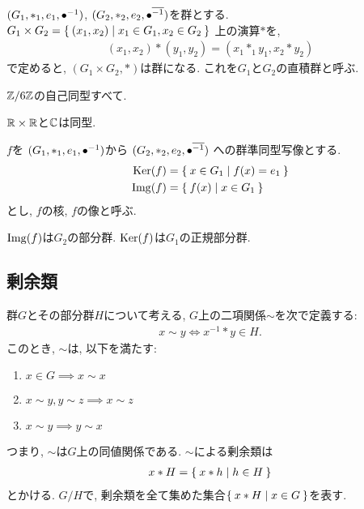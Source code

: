 \begin{prop}
  $(G_1,\ast_1,e_1,{\bullet}^{-1})$,
  $(G_2,\ast_2,e_2,{\bullet}^{\overline{-1}})$を群とする.
  $G_1\times G_2=\Set{(x_1,x_2)|x_1\in G_1,x_2\in G_2}$
  上の演算$\ast$を,
  \begin{align*}
    (x_1,x_2)\ast(y_1,y_2)=(x_1\ast_1y_1,x_2\ast y_2)
  \end{align*}
  で定めると, $(G_1\times G_2,\ast)$は群になる.
  これを$G_1$と$G_2$の直積群と呼ぶ.
\end{prop}

\begin{example}
  $\mathbb{Z}/6\mathbb{Z}$の自己同型すべて.
\end{example}
\begin{example}
$\mathbb{R}\times \mathbb{R}$と$\mathbb{C}$は同型.
\end{example}

\begin{definition}
  $f$を
  $(G_1,\ast_1,e_1,{\bullet}^{-1})$から
  $(G_2,\ast_2,e_2,{\bullet}^{\overline{-1}})$
  への群準同型写像とする.
  \begin{align*}
    \operatorname{Ker}(f)&=\Set{x\in G_1|f(x)=e_1}\\
    \operatorname{Img}(f)&=\Set{f(x)|x\in G_1}
  \end{align*}
  とし, $f$の核, $f$の像と呼ぶ.
\end{definition}

\begin{prop}
  $\operatorname{Img}(f)$は$G_2$の部分群.
  $\operatorname{Ker}(f)$は$G_1$の正規部分群.
\end{prop}

\subsection{剰余類}
  群$G$とその部分群$H$について考える,
  $G$上の二項関係$\sim$を次で定義する:
  \begin{align*}
    x\sim y\iff x^{-1}\ast y\in H.
  \end{align*}
  このとき, $\sim$は, 以下を満たす:
  \begin{enumerate}
    \item $x\in G \implies x\sim x$
    \item $x\sim y, y\sim z \implies x\sim z$
    \item $x\sim y \implies y\sim x$
  \end{enumerate}
  つまり, $\sim$は$G$上の同値関係である.
  $\sim$による剰余類は
  \begin{align*}
    x\ast H = \Set{x\ast h|h\in H} 
  \end{align*}
  とかける.
  $G/H$で, 剰余類を全て集めた集合$\Set{x\ast H| x\in G}$を表す.

